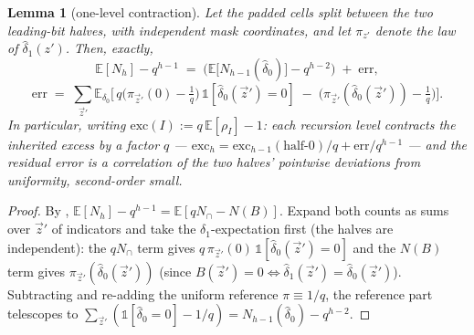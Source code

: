 \documentclass{article}
\newtheorem{lemma}[theorem]{Lemma}
\theoremstyle{definition}
\begin{document}
\begin{lemma}[one-level contraction]\label{lem:contract}
Let the padded cells split between the two leading-bit halves, with independent mask coordinates, and let $\pi_{z'}$ denote the law of $\hat\delta_1(z')$. Then, \emph{exactly},
\[
\mathbb{E}[N_h] - q^{h-1} \;=\; \Big(\mathbb{E}\big[N_{h-1}(\hat\delta_0)\big] - q^{h-2}\Big) \;+\; \mathrm{err},
\]
\[
\mathrm{err} \;=\; \sum_{\vec z'} \mathbb{E}_{\delta_0}\Big[\, q\big(\pi_{\vec z'}(0) - \tfrac1q\big)\,\mathbb{1}[\hat\delta_0(\vec z') = 0] \;-\; \big(\pi_{\vec z'}(\hat\delta_0(\vec z')) - \tfrac1q\big) \Big] .
\]
In particular, writing $\mathrm{exc}(I) := q\,\mathbb{E}[\rho_I] - 1$: each recursion level \emph{contracts} the inherited excess by a factor $q$ --- $\mathrm{exc}_h = \mathrm{exc}_{h-1}(\text{half-}0)/q + \mathrm{err}/q^{h-1}$ --- and the residual error is a \emph{correlation of the two halves' pointwise deviations from uniformity}, second-order small.
\end{lemma}

\begin{proof}
By , $\mathbb{E}[N_h] - q^{h-1} = \mathbb{E}[q N_\cap - N(B)]$. Expand both counts as sums over $\vec z'$ of indicators and take the $\delta_1$-expectation first (the halves are independent): the $qN_\cap$ term gives $q\,\pi_{\vec z'}(0)\,\mathbb{1}[\hat\delta_0(\vec z') = 0]$ and the $N(B)$ term gives $\pi_{\vec z'}(\hat\delta_0(\vec z'))$ (since $B(\vec z') = 0 \Leftrightarrow \hat\delta_1(\vec z') = \hat\delta_0(\vec z')$). Subtracting and re-adding the uniform reference $\pi \equiv 1/q$, the reference part telescopes to $\sum_{\vec z'}(\mathbb{1}[\hat\delta_0 = 0] - 1/q) = N_{h-1}(\hat\delta_0) - q^{h-2}$.
\end{proof}
\end{document}
